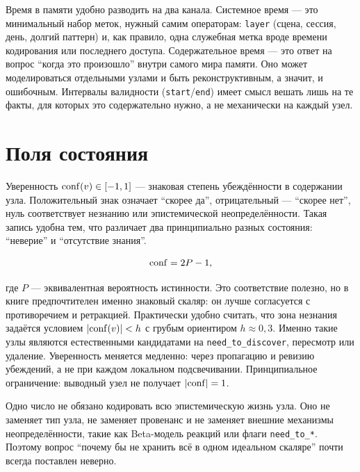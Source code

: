 \begin{definition}
Время в памяти удобно разводить на два канала. Системное время --- это
минимальный набор меток, нужный самим операторам: \texttt{layer} (сцена,
сессия, день, долгий паттерн) и, как правило, одна служебная метка вроде
времени кодирования или последнего доступа. Содержательное время --- это ответ
на вопрос ``когда это произошло'' внутри самого мира памяти. Оно может
моделироваться отдельными узлами и быть реконструктивным, а значит, и
ошибочным. Интервалы валидности (\texttt{start}/\texttt{end}) имеет смысл
вешать лишь на те факты, для которых это содержательно нужно, а не
механически на каждый узел.
\end{definition}

\section{Поля состояния}

\begin{definition}[Уверенность]
Уверенность $\mathrm{conf}(v) \in [-1, 1]$ --- знаковая степень убеждённости в
содержании узла. Положительный знак означает ``скорее да'', отрицательный ---
``скорее нет'', нуль соответствует незнанию или эпистемической
неопределённости. Такая запись удобна тем, что различает два принципиально
разных состояния: ``неверие'' и ``отсутствие знания''.
\end{definition}

\begin{equation}
\mathrm{conf} = 2P - 1,
\end{equation}

где $P$ --- эквивалентная вероятность истинности. Это соответствие полезно, но
в книге предпочтителен именно знаковый скаляр: он лучше согласуется с
противоречием и ретракцией. Практически удобно считать, что зона незнания
задаётся условием $|\mathrm{conf}(v)| < h$ с грубым ориентиром $h \approx 0{,}3$.
Именно такие узлы являются естественными кандидатами на
\texttt{need\_to\_discover}, пересмотр или удаление. Уверенность меняется
медленно: через пропагацию и ревизию убеждений, а не при каждом локальном
подсвечивании. Принципиальное ограничение: выводный узел не получает
$|\mathrm{conf}| = 1$.

\begin{pitfall}
Одно число не обязано кодировать всю эпистемическую жизнь узла. Оно не
заменяет тип узла, не заменяет провенанс и не заменяет внешние механизмы
неопределённости, такие как Beta-модель реакций или флаги \texttt{need\_to\_*}.
Поэтому вопрос ``почему бы не хранить всё в одном идеальном скаляре'' почти
всегда поставлен неверно.
\end{pitfall}

